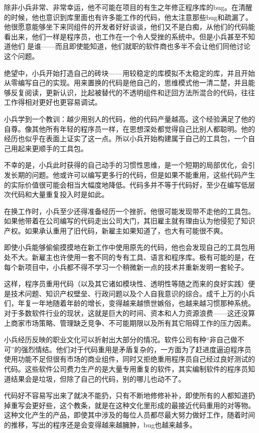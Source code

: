 \documentclass[12pt,oneside]{book}
\begin{document}
\begin{common-format}
除非小兵非常、非常幸运，他不可能在项目的有生之年修正程序库的bug。在清醒的时候，他也意识到库里面也有许多能工作的代码，他太注意那些bug和疏漏了。他很愿意能够坐下来同组件的开发者好好谈谈，他们又不是白痴，从他们的代码能看出来，他们一样是程序员，也工作在一个令人受挫的系统中。但是小兵甚至不知道他们
是谁——而且即使能知道，他们就职的软件商也多半不会让他们同他讨论这个问题。

绝望中，小兵开始打造自己的砖块——用较稳定的库模拟不太稳定的库，并且开始从零编写自己的实现。用来置换的代码是他自己的，思维模式他一清二楚，并且能够反复阅读，更新认识，比起被替代的不透明组件和迂回方法所混合的代码，往往工作得相对更好也更容易调试。

小兵学到一个教训：越少用别人的代码，他的代码产量越高。这个经验满足了他的自尊。像其他所有年轻的程序员一样，在思想深处都觉得自己比别人都聪明。他的经历也似乎在表面上证实了这一点。所以小兵开始构建属于自己的工具包，一个自己用起来更顺手的工具包。

不幸的是，小兵此时获得的自己动手的习惯性思维，是一个短期的局部优化，会引发长期的问题。他或许可以编写更多行的代码，但是如果不能重用，这些代码产生的实际价值很可能会相当大幅度地降低。代码多并不等于代码好，至少在编写低层次代码和大量重复投入时是如此。

在换工作时，小兵至少还得准备经历一个挫折。他很可能发现带不走他的工具包。如果他带着在公司编写的代码走出公司大门，其旧雇主就有理由认为他侵犯了知识产权。如果承认重用了旧代码，新雇主如果知道了，也大有可能很不爽。

即使小兵能够偷偷摸摸地在新工作中使用原先的代码，他也会发现自己的工具包用处不大。新雇主也许使用一套不同的专有工具、语言和程序库。极有可能的是，在每个新项目中，小兵都不得不学习一个稍微新一点的技术并重新发明一套轮子。

这样，程序员重用代码（以及其它诸如模块性、透明性等随之而来的良好实践）便是技术问题、知识产权壁垒、行政问题以及个人自我意识的综合。成千上万的小兵们，年复一年地随着年龄的增长，变得越来越愤世嫉俗，也越来越习惯那种系统。对于多数软件行业的现状，这就是巨大的时间、资本和人力资源浪费——这还没算上商家市场策略、管理缺乏竞争、不可能期限以及所有其它阻碍工作的压力因素。

小兵经历反映的职业文化可以折射出大部分的情况。软件公司有种“非自己做不可”的强烈情结。他们对于代码重用是矛盾复杂的，一方面为了赶进度逼迫程序员使用功能不足但很有市场的商业组件，同时又拒绝重用程序员自己经过良好测试的代码。这些软件公司费力生产的是大量专用重复的软件，其实编制软件的程序员知道结果会是垃圾，但除了自己的代码，别的哪儿也动不了。

代码好不容易写出来了就决不能扔，只有不断地修修补补，即使所有的人都知道扔掉重写会更好些，这个教条，就是在这种文化里形成的最接近代码重用的对等物。这种文化产生的产品，即使其中涉及的每位人员都尽最大努力做好工作，随着时间的推移，写出的程序还是会变得越来越臃肿，bug也越来越多。



\end{common-format}
\end{document}
